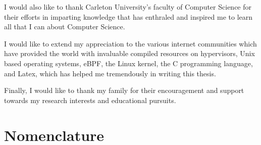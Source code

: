 \documentclass{report}
\begin{document}
\begin{spacing}{1.5}
{\large 
\noindent I would also like to thank Carleton University's faculty of Computer Science for their efforts in imparting knowledge that has enthraled and inspired me to learn all that I can about Computer Science.
\leavevmode\newline
}

{\large 
\noindent I would like to extend my appreciation to the various internet communities which have provided the world with invaluable compiled resources on hypervisors, Unix based operating systems, eBPF, the Linux kernel, the C programming language, and Latex, which has helped me tremendously in writing this thesis.
\leavevmode\newline
}

{\large 
\noindent Finally, I would like to thank my family for their encouragement and support towards my research interests and educational pursuits.
\leavevmode\newline
}




\tableofcontents
\newpage


{}
\listoffigures
\newpage


{}
\listoftables
\newpage



{}
\lstlistoflistings




\chapter*{Nomenclature}


\end{spacing}
\end{document}
